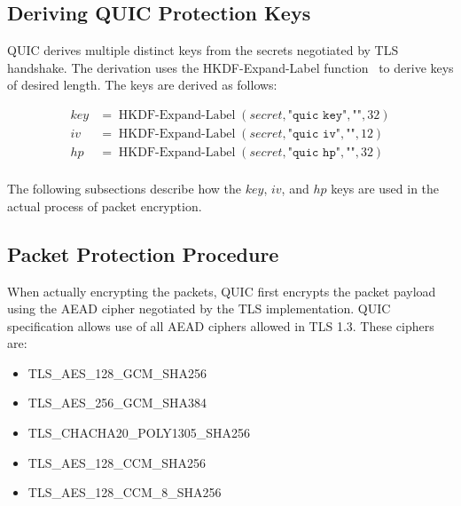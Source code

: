 \subsection{Deriving QUIC Protection Keys}\label{sec:02-encryption-key-derivation}

QUIC derives multiple distinct keys from the secrets negotiated by TLS handshake. The derivation
uses the HKDF-Expand-Label function~\cite{rfc5869} to derive keys of desired length. The keys are
derived as follows:

\begin{equation*}
  \begin{split}
  key & = \operatorname{HKDF-Expand-Label}(secret, \texttt{"quic key"}, \texttt{""}, 32) \\
  iv  & = \operatorname{HKDF-Expand-Label}(secret, \texttt{"quic iv"}, \texttt{""}, 12)  \\
  hp  & = \operatorname{HKDF-Expand-Label}(secret, \texttt{"quic hp"}, \texttt{""}, 32)  \\
  \end{split}
\end{equation*}

The following subsections describe how the $key$, $iv$, and $hp$ keys are used in the actual process
of packet encryption.

\subsection{Packet Protection Procedure}

When actually encrypting the packets, QUIC first encrypts the packet payload using the AEAD cipher
negotiated by the TLS implementation. QUIC specification allows use of all AEAD ciphers allowed in
TLS 1.3. These ciphers are:

\begin{itemize}

  \item TLS\_AES\_128\_GCM\_SHA256

  \item TLS\_AES\_256\_GCM\_SHA384

  \item TLS\_CHACHA20\_POLY1305\_SHA256

  \item TLS\_AES\_128\_CCM\_SHA256

  \item TLS\_AES\_128\_CCM\_8\_SHA256

\end{itemize}


